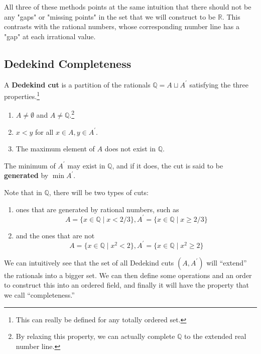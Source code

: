   All three of these methods points at the same intuition that there should not be any "gaps" or "missing points" in the set that we will construct to be $\mathbb{R}$. This contrasts with the rational numbers, whose corresponding number line has a "gap" at each irrational value. 

\subsection{Dedekind Completeness} 

  \begin{definition} 
    A \textbf{Dedekind cut} is a partition of the rationals $\mathbb{Q} = A \sqcup A^\prime$ satisfying the three properties.\footnote{This can really be defined for any totally ordered set. } 
    \begin{enumerate}
      \item $A \neq \emptyset$ and $A \neq \mathbb{Q}$.\footnote{By relaxing this property, we can actually complete $\mathbb{Q}$ to the extended real number line. }
      \item $x < y$ for all $x \in A, y \in A^\prime$. 
      \item The maximum element of $A$ does not exist in $\mathbb{Q}$. 
    \end{enumerate}
    The minimum of $A^\prime$ may exist in $\mathbb{Q}$, and if it does, the cut is said to be \textbf{generated} by $\min A^\prime$. 
  \end{definition}

  Note that in $\mathbb{Q}$, there will be two types of cuts: 
  \begin{enumerate}
    \item ones that are generated by rational numbers, such as 
    \begin{equation}
      A = \{x \in \mathbb{Q} \mid x < 2/3 \}, A^\prime = \{ x \in \mathbb{Q} \mid x \geq 2/3 \} 
    \end{equation}
    \item and the ones that are not 
    \begin{equation}
      A = \{x \in \mathbb{Q} \mid x^2 < 2 \}, A^\prime = \{x \in \mathbb{Q} \mid x^2 \geq 2 \}
    \end{equation}
  \end{enumerate}
  We can intuitively see that the set of all Dedekind cuts $(A, A^\prime)$ will ``extend'' the rationals into a bigger set. We can then define some operations and an order to construct this into an ordered field, and finally it will have the property that we call ``completeness.''

